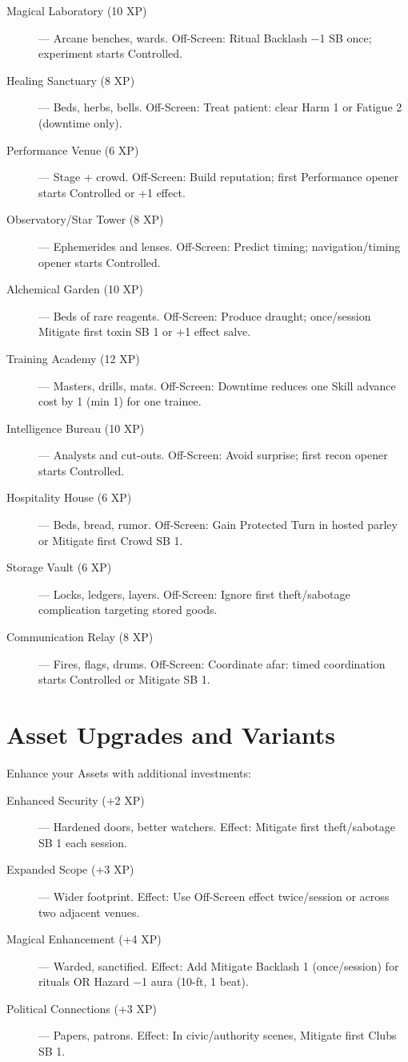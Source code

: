 \begin{description}
  \item[Magical Laboratory (10 XP)] — Arcane benches, wards. Off-Screen: Ritual Backlash −1 SB once; experiment starts Controlled.
  \item[Healing Sanctuary (8 XP)] — Beds, herbs, bells. Off-Screen: Treat patient: clear Harm 1 or Fatigue 2 (downtime only).
  \item[Performance Venue (6 XP)] — Stage + crowd. Off-Screen: Build reputation; first Performance opener starts Controlled or +1 effect.
  \item[Observatory/Star Tower (8 XP)] — Ephemerides and lenses. Off-Screen: Predict timing; navigation/timing opener starts Controlled.
  \item[Alchemical Garden (10 XP)] — Beds of rare reagents. Off-Screen: Produce draught; once/session Mitigate first toxin SB 1 or +1 effect salve.
  \item[Training Academy (12 XP)] — Masters, drills, mats. Off-Screen: Downtime reduces one Skill advance cost by 1 (min 1) for one trainee.
  \item[Intelligence Bureau (10 XP)] — Analysts and cut-outs. Off-Screen: Avoid surprise; first recon opener starts Controlled.
  \item[Hospitality House (6 XP)] — Beds, bread, rumor. Off-Screen: Gain Protected Turn in hosted parley or Mitigate first Crowd SB 1.
  \item[Storage Vault (6 XP)] — Locks, ledgers, layers. Off-Screen: Ignore first theft/sabotage complication targeting stored goods.
  \item[Communication Relay (8 XP)] — Fires, flags, drums. Off-Screen: Coordinate afar: timed coordination starts Controlled or Mitigate SB 1.
\end{description}

\section{Asset Upgrades and Variants}

Enhance your Assets with additional investments:

\begin{description}
  \item[Enhanced Security (+2 XP)] — Hardened doors, better watchers. Effect: Mitigate first theft/sabotage SB 1 each session.
  \item[Expanded Scope (+3 XP)] — Wider footprint. Effect: Use Off-Screen effect twice/session or across two adjacent venues.
  \item[Magical Enhancement (+4 XP)] — Warded, sanctified. Effect: Add Mitigate Backlash 1 (once/session) for rituals OR Hazard −1 aura (10-ft, 1 beat).
  \item[Political Connections (+3 XP)] — Papers, patrons. Effect: In civic/authority scenes, Mitigate first Clubs SB 1.
\end{description}

